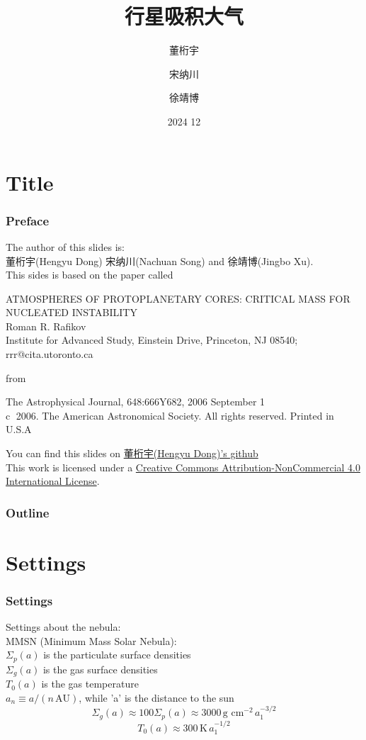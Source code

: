 \documentclass{beamer}
\title{行星吸积大气}
\author{董桁宇 \and 宋纳川 \and 徐靖博}
\date{2024 12}
\begin{document}
\section{Title}
\frame{\titlepage}
\begin{frame}
\frametitle{Preface}
The author of this slides is:\\
董桁宇(Hengyu Dong) 宋纳川(Nachuan Song) and 徐靖博(Jingbo Xu).\\
This sides is based on the paper called\\
\begin{center} 
ATMOSPHERES OF PROTOPLANETARY CORES: CRITICAL MASS FOR NUCLEATED INSTABILITY\\ 
Roman R. Rafikov\\
{\tiny Institute for Advanced Study, Einstein Drive, Princeton, NJ 08540; rrr@cita.utoronto.ca}
\end{center}
from\\
\begin{center}
The Astrophysical Journal, 648:666Y682, 2006 September 1\\
{\tiny \textcircled{c} 2006. The American Astronomical Society. All rights reserved. Printed in U.S.A}
\end{center}
You can find this slides on \href{https://github.com/little-potato-loria/the-pre-of-astrophysics}{董桁宇(Hengyu Dong)'s github}\\
{\tiny This work is licensed under a \href{https://creativecommons.org/licenses/by-nc/4.0/}{Creative Commons Attribution-NonCommercial 4.0 International License}.}
\end{frame}
\begin{frame}
\frametitle{Outline}
\tableofcontents
\end{frame}
\section{Settings}
\begin{frame}
\frametitle{Settings}
Settings about the nebula:\\
MMSN (Minimum Mass Solar Nebula):\\
$\Sigma_p(a)$ is the particulate surface densities\\
$\Sigma_g(a)$ is the gas surface densities\\
$T_0(a)$ is the gas temperature \\
$a_n \equiv a/(n \, \text{AU})$, while 'a' is the distance to the sun
\begin{equation}
\Sigma_g(a) \approx 100 \Sigma_p(a) \approx 3000 \, \text{g cm}^{-2} \, a_1^{-3/2}
\end{equation}
\begin{equation}
T_0(a) \approx 300 \, \text{K} \, a_1^{-1/2}
\end{equation}
\end{frame}
\end{document}

